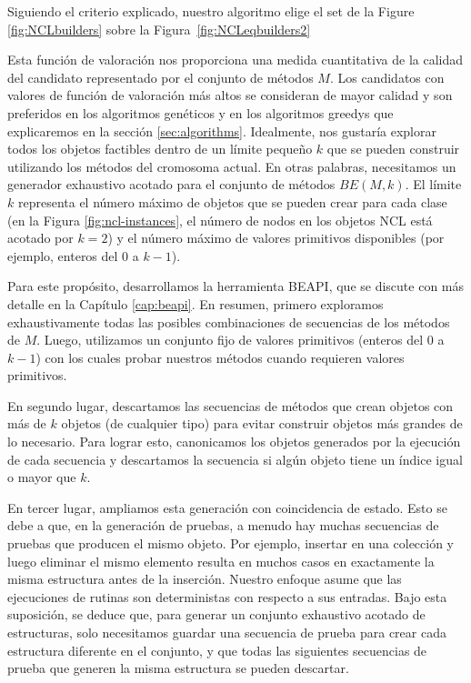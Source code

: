 Siguiendo el criterio explicado, nuestro algoritmo elige el set de la Figure \ref{fig:NCLbuilders} sobre la Figura~\ref{fig:NCLeqbuilders2}



Esta función de valoración nos proporciona una medida cuantitativa de la calidad del candidato representado por el conjunto de métodos $M$. Los candidatos con valores de función de valoración más altos se consideran de mayor calidad y son preferidos en los algoritmos genéticos y en los algoritmos greedys que explicaremos en la sección \ref{sec:algorithms}.
Idealmente, nos gustaría explorar todos los objetos factibles dentro de un límite pequeño $k$ que se pueden construir utilizando los métodos del cromosoma actual. En otras palabras, necesitamos un generador exhaustivo acotado para el conjunto de métodos $BE(M, k)$. El límite $k$ representa el número máximo de objetos que se pueden crear para cada clase (en la Figura \ref{fig:ncl-instances}, el número de nodos en los objetos NCL está acotado por $k=2$) y el número máximo de valores primitivos disponibles (por ejemplo, enteros del 0 a $k-1$).

Para este propósito, desarrollamos la herramienta BEAPI, que se discute con más detalle en la Capítulo \ref{cap:beapi}. En resumen, primero exploramos exhaustivamente todas las posibles combinaciones de secuencias de los métodos de $M$. Luego, utilizamos un conjunto fijo de valores primitivos (enteros del 0 a $k-1$) con los cuales probar nuestros métodos cuando requieren valores primitivos.

En segundo lugar, descartamos las secuencias de métodos que crean objetos con más de $k$ objetos (de cualquier tipo) para evitar construir objetos más grandes de lo necesario. Para lograr esto, canonicamos los objetos generados por la ejecución de cada secuencia y descartamos la secuencia si algún objeto tiene un índice igual o mayor que $k$.

En tercer lugar, ampliamos esta generación con coincidencia de estado. Esto se debe a que, en la generación de pruebas, a menudo hay muchas secuencias de pruebas que producen el mismo objeto. Por ejemplo, insertar en una colección y luego eliminar el mismo elemento resulta en muchos casos en exactamente la misma estructura antes de la inserción. Nuestro enfoque asume que las ejecuciones de rutinas son deterministas con respecto a sus entradas. Bajo esta suposición, se deduce que, para generar un conjunto exhaustivo acotado de estructuras, solo necesitamos guardar una secuencia de prueba para crear cada estructura diferente en el conjunto, y que todas las siguientes secuencias de prueba que generen la misma estructura se pueden descartar.

